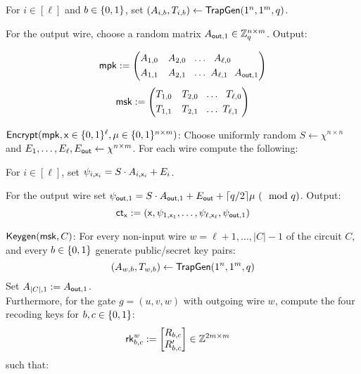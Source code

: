 \BI
\item For $i \in [\ell]$ and $b\in\{0,1\}$, set $(A_{i,b}, T_{i,b})\leftarrow {\mathsf{TrapGen}}(1^n,1^m,q)$.
\item For the output wire, choose a random matrix $A_{\mathsf{out},1} \in \mathbb{Z}_q^{n\times m}$.
\EI
Output:
\begin{multicols}{2}
\begin{equation*}
    {\mathsf{mpk}}:=\left(  
         \begin{split} A_{1,0}~&~~A_{2,0}~~\ldots~~A_{\ell,0} \\
        A_{1,1}~&~~A_{2,1}~~\ldots~A_{\ell,1}~~ A_{\mathsf{out},1}    
               \end{split}
    \right)
    \end{equation*}\break    
    \begin{equation*}
    {\mathsf{msk}}:=\left(  
         \begin{split} T_{1,0}~&~~T_{2,0}~~\ldots~~T_{\ell,0} \\
        T_{1,1}~&~~T_{2,1}~~\ldots~T_{\ell,1}~    
               \end{split}
    \right)
    \end{equation*}
\end{multicols}
\item ${\mathsf{Encrypt}}({\mathsf{mpk}},\mathsf{x}\in\{0,1\}^\ell,\mu\in\{0,1\}^{n\times m})$: Choose uniformly random $S  \leftarrow \chi^{n\times n}$ and $E_1,\ldots,E_\ell,E_\mathsf{out}\leftarrow\chi^{n\times m}$. For each wire compute the following: 

\BI
\item For $i \in [\ell]$, set $\psi_{i,\mathsf{x}_i}=S\cdot A_{i,\mathsf{x}_i}+E_i$.
\item For the output wire set $\psi_{\mathsf{out},1}=S\cdot A_{\mathsf{out},1}+E_\mathsf{out} + \lceil q/2\rceil \mu ~(\mod q)$.
\EI 
Output: 
$$ {\mathsf{ct}}_{\mathsf{x}}:=(\mathsf{x},\psi_{1,\mathsf{x}_1},\ldots,\psi_{\ell,\mathsf{x}_\ell},\psi_{\mathsf{out},1})$$

\item $\mathsf{Keygen}({\mathsf{msk}},C)$: For every non-input wire $w = \ell+1,\ldots,|C|-1$ of the circuit $C$, and every $b\in\{0,1\}$ generate
public/secret key pairs:
$$ (A_{w,b}, T_{w,b})\leftarrow {\mathsf{TrapGen}}(1^n,1^m,q)$$
Set $A_{|C|,1}:=A_{\mathsf{out},1}$.\\
Furthermore, for the gate $g = (u, v,w)$ with outgoing wire $w$, compute the four recoding keys  for $b,c\in\{0,1\}$: \begin{align*}
    {\mathsf{rk}}^w_{b,c} &:= \begin{bmatrix}
          R_{b,c} \\
          R'_{b,c} \\
         \end{bmatrix} \in \mathbb{Z}^{2m\times m}
  \end{align*}
 such that: 





